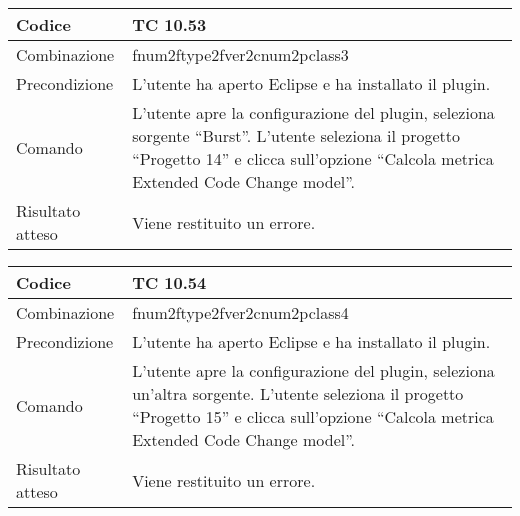 \begin{table}[ht]
\begin{tabular}{|p{3cm}|p{9cm}|}
\hline
\cellcolor{lightgray}Codice				& TC 10.53								\\
\hline
\cellcolor{lightgray}Combinazione		& fnum2ftype2fver2cnum2pclass3									\\
\hline
\cellcolor{lightgray}Precondizione		& L'utente ha aperto Eclipse e ha installato il plugin.		\\
\hline
\cellcolor{lightgray}Comando			& L'utente apre la configurazione del plugin, seleziona sorgente ``Burst''. L'utente seleziona il progetto ``Progetto 14''  e clicca sull'opzione ``Calcola metrica Extended Code Change model''.	\\
\hline
\cellcolor{lightgray}Risultato atteso	& Viene restituito un errore.\\
\hline
\end{tabular}
\end{table}

\begin{table}[ht]
\begin{tabular}{|p{3cm}|p{9cm}|}
\hline
\cellcolor{lightgray}Codice				& TC 10.54								\\
\hline
\cellcolor{lightgray}Combinazione		& fnum2ftype2fver2cnum2pclass4									\\
\hline
\cellcolor{lightgray}Precondizione		& L'utente ha aperto Eclipse e ha installato il plugin.		\\
\hline
\cellcolor{lightgray}Comando			& L'utente apre la configurazione del plugin, seleziona un'altra sorgente. L'utente seleziona il progetto ``Progetto 15''  e clicca sull'opzione ``Calcola metrica Extended Code Change model''.	\\
\hline
\cellcolor{lightgray}Risultato atteso	& Viene restituito un errore.\\
\hline
\end{tabular}
\end{table}

\clearpage
